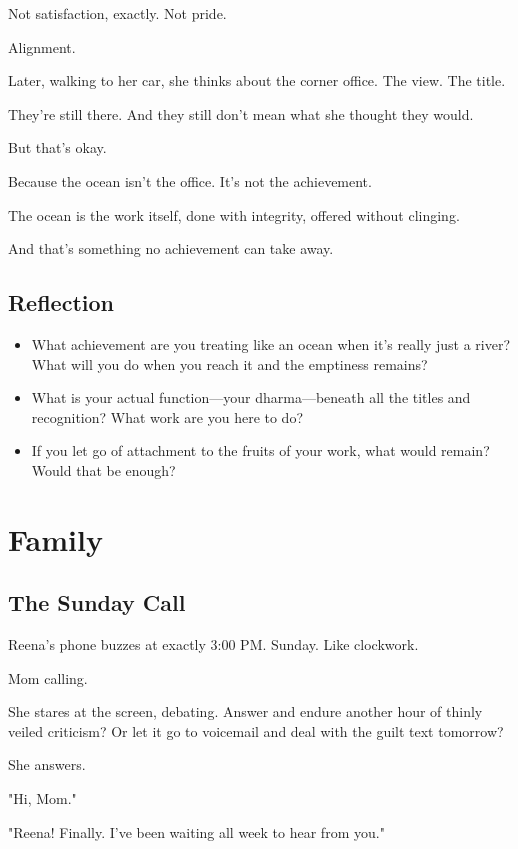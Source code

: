\documentclass[11pt,twoside]{book}
\begin{document}
Not satisfaction, exactly. Not pride.

Alignment.

Later, walking to her car, she thinks about the corner office. The view. The title.

They're still there. And they still don't mean what she thought they would.

But that's okay.

Because the ocean isn't the office. It's not the achievement.

The ocean is the work itself, done with integrity, offered without clinging.

And that's something no achievement can take away.

\section*{Reflection}

\begin{itemize}
\item What achievement are you treating like an ocean when it's really just a river? What will you do when you reach it and the emptiness remains?
\item What is your actual function—your dharma—beneath all the titles and recognition? What work are you here to do?
\item If you let go of attachment to the fruits of your work, what would remain? Would that be enough?
\end{itemize}

\chapter{Family}

\section*{The Sunday Call}

Reena's phone buzzes at exactly 3:00 PM. Sunday. Like clockwork.

Mom calling.

She stares at the screen, debating. Answer and endure another hour of thinly veiled criticism? Or let it go to voicemail and deal with the guilt text tomorrow?

She answers.

"Hi, Mom."

"Reena! Finally. I've been waiting all week to hear from you."
\end{document}
